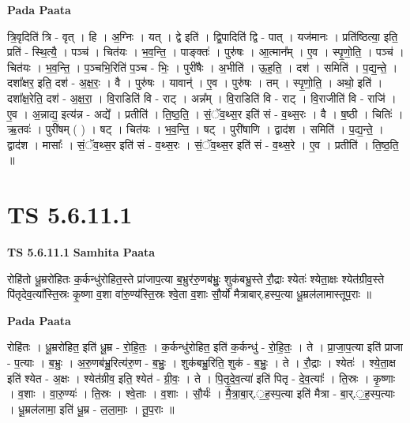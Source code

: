 \documentclass[17pt]{extarticle}
\begin{document}
\textbf{Pada Paata} \newline

त्रि॒वृदिति॑ त्रि - वृत् । हि । अ॒ग्निः । यत् । द्वे इति॑ । द्वि॒पादिति॑ द्वि - पात् । यज॑मानः । प्रति॑ष्ठित्या॒ इति॒ प्रति॑ - स्थि॒त्यै॒ । पञ्च॑ । चित॑यः । भ॒व॒न्ति॒ । पाङ्क्तः॑ । पुरु॑षः । आ॒त्मान᳚म् । ए॒व । स्पृ॒णो॒ति॒ । पञ्च॑ । चित॑यः । भ॒व॒न्ति॒ । प॒ञ्चभि॒रिति॑ प॒ञ्च - भिः॒ । पुरी॑षैः । अ॒भीति॑ । ऊ॒ह॒ति॒ । दश॑ । समिति॑ । प॒द्य॒न्ते॒ । दशा᳚क्षर॒ इति॒ दश॑ - अ॒क्ष॒रः॒ । वै । पुरु॑षः । यावान्॑ । ए॒व । पुरु॑षः । तम् । स्पृ॒णो॒ति॒ । अथो॒ इति॑ । दशा᳚क्ष॒रेति॒ दश॑ - अ॒क्ष॒रा॒ । वि॒राडिति॑ वि - राट् । अन्न᳚म् । वि॒राडिति॑ वि - राट् । वि॒राजीति॑ वि - राजि॑ । ए॒व । अ॒न्नाद्य॒ इत्य॑न्न - अद्ये᳚ । प्रतीति॑ । ति॒ष्ठ॒ति॒ । सं॒ॅव॒थ्स॒र इति॑ सं - व॒थ्स॒रः । वै । ष॒ष्ठी । चितिः॑ । ऋ॒तवः॑ । पुरी॑षम् ( ) । षट् । चित॑यः । भ॒व॒न्ति॒ । षट् । पुरी॑षाणि । द्वाद॑श । समिति॑ । प॒द्य॒न्ते॒ । द्वाद॑श । मासाः᳚ । सं॒ॅव॒थ्स॒र इति॑ सं - व॒थ्स॒रः । सं॒ॅव॒थ्स॒र इति॑ सं - व॒थ्स॒रे । ए॒व । प्रतीति॑ । ति॒ष्ठ॒ति॒ ॥  \newline





\section{ TS 5.6.11.1 }

\textbf{TS 5.6.11.1 } \newline
\textbf{Samhita Paata} \newline

रोहि॑तो धू॒म्ररो॑हितः क॒र्कन्धु॑रोहित॒स्ते प्रा॑जाप॒त्या ब॒भ्रुर॑रु॒णब॑भ्रुः॒ शुक॑बभ्रु॒स्ते रौ॒द्राः श्येतः॑ श्येता॒क्षः श्येत॑ग्रीव॒स्ते पि॑तृदेव॒त्या᳚स्ति॒स्रः कृ॒ष्णा व॒शा वा॑रु॒ण्य॑स्ति॒स्रः श्वे॒ता व॒शाः सौ॒र्यो॑ मैत्राबार्.हस्प॒त्या धू॒म्रल॑लामास्तूप॒राः ॥ \newline

\textbf{Pada Paata} \newline

रोहि॑तः । धू॒म्ररो॑हित॒ इति॑ धू॒म्र - रो॒हि॒तः॒ । क॒र्कन्धु॑रोहित॒ इति॑ क॒र्कन्धु॑ - रो॒हि॒तः॒ । ते । प्रा॒जा॒प॒त्या इति॑ प्राजा - प॒त्याः । ब॒भ्रुः । अ॒रु॒णब॑भ्रु॒रित्य॑रु॒ण - ब॒भ्रुः॒ । शुक॑बभ्रु॒रिति॒ शुक॑ - ब॒भ्रुः॒ । ते । रौ॒द्राः । श्येतः॑ । श्ये॒ता॒क्ष इति॑ श्येत - अ॒क्षः । श्येत॑ग्रीव॒ इति॒ श्येत॑ - ग्री॒वः॒ । ते । पि॒तृ॒दे॒व॒त्या॑ इति॑ पितृ - दे॒व॒त्याः᳚ । ति॒स्रः । कृ॒ष्णाः । व॒शाः । वा॒रु॒ण्यः॑ । ति॒स्रः । श्वे॒ताः । व॒शाः । सौ॒र्यः॑ । मै॒त्रा॒बा॒र्.॒ह॒स्प॒त्या इति॑ मैत्रा - बा॒र्.॒ह॒स्प॒त्याः । धू॒म्रल॑लामा॒ इति॑ धू॒म्र - ल॒ला॒माः॒ । तू॒प॒राः ॥  \newline
\end{document}
